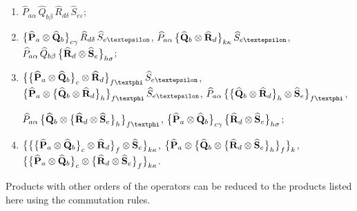 \begin{enumerate}[label=(\alph*)]
\item \(\widehat{P}_{a \alpha} \, \widehat{Q}_{b \beta} \, \widehat{R}_{d \delta} \, \widehat{S}_{e \varepsilon}\);
\item \(\bigl\{\widehat{\vect{P}}_{a} \otimes \widehat{\vect{Q}}_{b}\bigr\}_{c \gamma} \, \widehat{R}_{d \delta} \, \widehat{S}_{e \varepsilon}\), \(\widehat{P}_{a \alpha} \,\bigl\{\widehat{\vect{Q}}_{b} \otimes \widehat{\vect{R}}_{d}\bigr\}_{k \kappa} \, \widehat{S}_{e \varepsilon}\), \(\widehat{P}_{a \alpha} \, \widehat{Q}_{b \beta} \,\bigl\{\widehat{\mathbf{R}}_{d} \otimes \widehat{\mathbf{S}}_{e}\bigr\}_{h \sigma}\);
\item \(\bigl\{\bigl\{\widehat{\vect{P}}_{a} \otimes \widehat{\vect{Q}}_{b}\bigr\}_{c} \otimes \widehat{\vect{R}}_{d}\bigr\}_{f \varphi} \, \widehat{S}_{e \varepsilon}\), \(\bigl\{\widehat{\vect{P}}_{a} \otimes\bigl\{\widehat{\vect{Q}}_{b} \otimes \widehat{\vect{R}}_{d}\bigr\}_{h}\bigr\}_{f \varphi} \, \widehat{S}_{e \varepsilon}\),  \(\widehat{P}_{a \alpha} \,\bigl\{\bigl\{\widehat{\vect{Q}}_{b} \otimes \widehat{\vect{R}}_{d}\bigr\}_{h} \otimes \widehat{\vect{S}}_{e}\bigr\}_{f \varphi}\), \par \(\widehat{P}_{a \alpha} \,\bigl\{\widehat{\vect{Q}}_{b} \otimes\bigl\{\widehat{\vect{R}}_{d} \otimes \widehat{\vect{S}}_{e}\bigr\}_{h}\bigr\}_{f \varphi}\), \(\bigl\{\widehat{\mathbf{P}}_{a} \otimes \widehat{\mathbf{Q}}_{b}\bigr\}_{c \gamma} \,\bigl\{\widehat{\mathbf{R}}_{d} \otimes \widehat{\mathbf{S}}_{e}\bigr\}_{h \sigma}\);
\item \(\bigl\{\bigl\{\bigl\{\widehat{\mathbf{P}}_{a} \otimes \widehat{\mathbf{Q}}_{b}\bigr\}_{c} \otimes \widehat{\mathbf{R}}_{d}\bigr\}_{f} \otimes \widehat{\mathbf{S}}_{e}\bigr\}_{k \kappa}\), \(\bigl\{\widehat{\mathbf{P}}_{a} \otimes\bigl\{\widehat{\mathbf{Q}}_{b} \otimes\bigl\{\widehat{\mathbf{R}}_{d} \otimes \widehat{\mathbf{S}}_{e}\bigr\}_{h}\bigr\}_{f}\bigr\}_{k}\), \(\bigl\{\bigl\{\widehat{\mathbf{P}}_{a} \otimes \widehat{\mathbf{Q}}_{b}\bigr\}_{c} \otimes\bigl\{\widehat{\mathbf{R}}_{d} \otimes \widehat{\mathbf{S}}_{e}\bigr\}_{f}\bigr\}_{k \kappa}\).
\end{enumerate}
Products with other orders of the operators can be reduced to the products listed here using the commutation rules.

